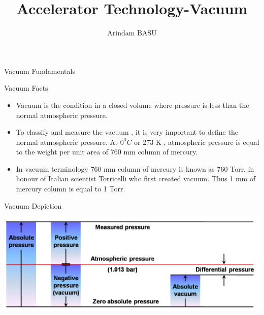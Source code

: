 \documentclass[11]{beamer}
\author{Arindam BASU \hspace{5 cm}\newline{arindam@barc.gov.in}}
\title{Accelerator Technology-Vacuum \newline{Vacuum Introduction Part-1}}
\institute{IADD,BARC}
\begin{document}
\begin{frame}
\titlepage
\end{frame}



\begin{frame}{Vacuum Fundamentals}
\begin{block}{Vacuum Facts}
\begin{itemize}
\item Vacuum is the condition in a closed volume where pressure is less than the normal atmospheric pressure. 
\item To classify and measure the vacuum , it is very important to define the normal atmospheric pressure.
At $0^0 C$ or 273 K , atmospheric pressure is equal to the weight per unit area of  760 mm column of mercury.
\item In vacuum terminology 760 mm column of mercury is known as 760 Torr, in honour of Italian scientist Torricelli who first created vacuum. Thus 1 mm  of mercury column is equal to 1 Torr.
\end{itemize}
\end{block}



\end{frame}



\begin{frame}{Vacuum Depiction}
\begin{center}
\includegraphics[width=1.0\textwidth]{VacuumDepiction.png}
\end{center}

\end{frame}
\end{document}
